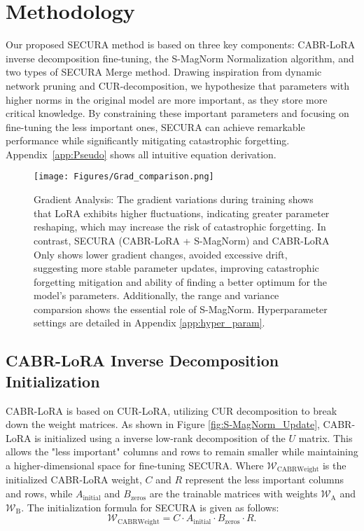 \section{Methodology}
Our proposed SECURA method is based on three key components: CABR-LoRA inverse decomposition fine-tuning, the S-MagNorm Normalization algorithm, and two types of SECURA Merge method. Drawing inspiration from dynamic network pruning and CUR-decomposition, we hypothesize that parameters with higher norms in the original model are more important, as they store more critical knowledge. By constraining these important parameters and focusing on fine-tuning the less important ones, SECURA can achieve remarkable performance while significantly mitigating catastrophic forgetting. Appendix~\ref{app:Pseudo} shows all intuitive equation derivation. 

\begin{figure*}[tb]
    \centering
    \texttt{[image: Figures/Grad\_comparison.png]}
    \caption{Gradient Analysis: The gradient variations during training shows that LoRA exhibits higher fluctuations, indicating greater parameter reshaping, which may increase the risk of catastrophic forgetting. In contrast, SECURA (CABR-LoRA + S-MagNorm) and CABR-LoRA Only shows lower gradient changes,  avoided excessive drift, suggesting more stable parameter updates, improving catastrophic forgetting mitigation and ability of finding a better optimum for the model's parameters. Additionally, the range and variance comparsion shows the essential role of S-MagNorm. Hyperparameter settings are detailed in Appendix \ref{app:hyper_param}.}
    \label{fig:Grad_analysis}
    \vspace{-1em}
\end{figure*}

\subsection{CABR-LoRA Inverse Decomposition Initialization}

CABR-LoRA is based on CUR-LoRA, utilizing CUR decomposition to break down the weight matrices. As shown in Figure \ref{fig:S-MagNorm_Update}, CABR-LoRA is initialized using a inverse low-rank decomposition of the 
\(U\) matrix. This allows the "less important" columns and rows to remain smaller while maintaining a higher-dimensional space for fine-tuning SECURA. Where \( \mathcal{W}_{\text{CABRWeight}} \) is the initialized CABR-LoRA weight, \( C \) and \( R \) represent the less important columns and rows, while \( A_{\text{initial}} \) and \( B_{\text{zeros}} \) are the trainable matrices with weights \( \mathcal{W}_{\text{A}} \) and \( \mathcal{W}_{\text{B}} \). The initialization formula for SECURA is given as follows:
\begin{equation}
    \mathcal{W}_{\text{CABRWeight}} = C\cdot A_{\text{initial}}\cdot B_{\text{zeros}}\cdot R.
\end{equation}

